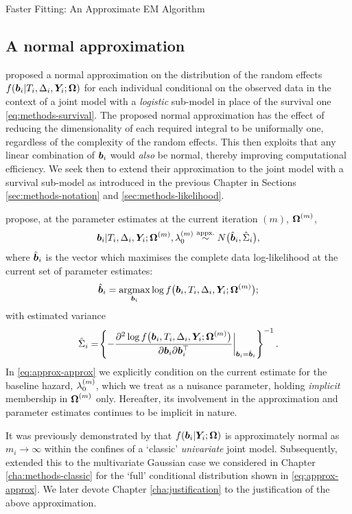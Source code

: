 \begin{chapter}{\label{cha:approx}Faster Fitting: An Approximate EM Algorithm}
\subsection{A normal approximation}\label{sec:approx-approx-specificbit}
 \citet{Bernhardt15} proposed a normal approximation on the distribution of the random effects $f\!\left(\bm{b}_i|T_i, \Delta_i, \bm{Y}_i; \bm{\mathrm{\Omega}}\right)$ for each individual conditional on the observed data in the context of a joint model with a \textit{logistic} sub-model in place of the survival one \eqref{eq:methods-survival}. The proposed normal approximation has the effect of reducing the dimensionality of each required integral to be uniformally one, regardless of the complexity of the random effects. This then exploits that any linear combination of $\bm{b}_i$ would \textit{also} be normal, thereby improving computational efficiency. We seek then to extend their approximation to the joint model with a survival sub-model as introduced in the previous Chapter in Sections \ref{sec:methods-notation} and \ref{sec:methods-likelihood}.

 \citet{Bernhardt15} propose, at the parameter estimates at the current iteration $(m)$, $\bm{\mathrm{\Omega}}^{(m)}$,
 \begin{align}
     \bm{b}_i|T_i,\Delta_i,\bm{Y}_i;\bm{\mathrm{\Omega}}^{(m)},\lambda_0^{(m)}\overset{\text{appx.}}{\sim} N\big(\hat{\bm{b}}_i,\hat{\Sigma}_i\big),
 \label{eq:approx-approx}
 \end{align}
  where $\hat{\bm{b}}_i$ is the vector which maximises the complete data log-likelihood at the current set of parameter estimates:
  \begin{align}
      \hat{\bm{b}}_i=\underset{\bm{b}_i}{\rm{argmax}}\log f\big(\bm{b}_i, T_i, \Delta_i, \bm{Y}_i; \bm{\mathrm{\Omega}}^{(m)}\big);
  \label{eq:approx-bhat}
  \end{align}
  with estimated variance
  \begin{align}
      \hat{\Sigma}_i=\!\left\{-\frac{\partial^2\log f\big(\bm{b}_i,T_i,\Delta_i,\bm{Y}_i;\bm{\mathrm{\Omega}}^{(m)}\big)}{\partial\bm{b}_i\partial\bm{b}_i^\top}
    \bigg\rvert_{\bm{b}_i=\hat{\bm{b}}_i}\right\}^{-1}.
  \label{eq:approx-Sigmahat}
  \end{align}
  In \eqref{eq:approx-approx} we explicitly condition on the current estimate for the baseline hazard, $\lambda_0^{(m)}$, which we treat as a nuisance parameter, holding \textit{implicit} membership in $\bm{\mathrm{\Omega}}^{(m)}$ only. Hereafter, its involvement in the approximation and parameter estimates continues to be implicit in nature.
  
  It was previously demonstrated by \citet{Rizopoulos2012} that $f\!\left(\bm{b}_i|\bm{Y}_i;\bm{\mathrm{\Omega}}\right)$ is approximately normal as $m_i\rightarrow\infty$ within the confines of a `classic' \textit{univariate} joint model. Subsequently, \citet{Bernhardt15} extended this to the multivariate Gaussian case we considered in Chapter \ref{cha:methods-classic} for the `full' conditional distribution shown in \eqref{eq:approx-approx}. We later devote Chapter \ref{cha:justification} to the justification of the above approximation.


\end{chapter}
